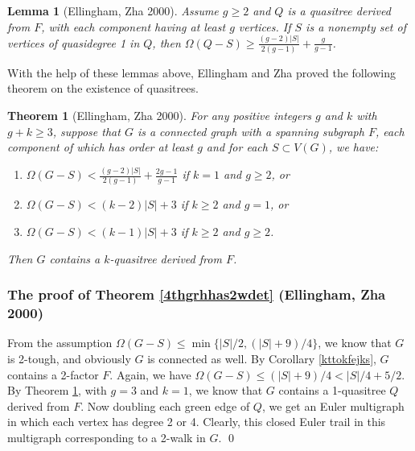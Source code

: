 \documentclass[12pt]{report}
\newtheorem{theorem}{Theorem}
\newtheorem{lemma}{Lemma}
\begin{document}
\begin{lemma}[Ellingham, Zha 2000]\label{lm33inez}
Assume $g\ge2$ and $Q$ is a quasitree derived from $F$, with each component having at least $g$ vertices. If $S$ is a nonempty set of vertices of quasidegree 1 in $Q$, then $\Omega(Q-S)\ge\frac{(g-2)|S|}{2(g-1)}+\frac{g}{g-1}$.
\end{lemma}

With the help of these lemmas above, Ellingham and Zha proved the following theorem on the existence of quasitrees.

\begin{theorem}[Ellingham, Zha 2000]\label{thm35inez}
For any positive integers $g$ and $k$ with $g+k\ge3$, suppose that $G$ is a connected graph with a spanning subgraph $F$, each component of which has order at least $g$ and for each $S\subset V(G)$, we have:
\begin{enumerate}
\item $\Omega(G-S)<\frac{(g-2)|S|}{2(g-1)}+\frac{2g-1}{g-1}$ if $k=1$ and $g\ge2$, or
\item $\Omega(G-S)<(k-2)|S|+3$ if $k\ge2$ and $g=1$, or
\item $\Omega(G-S)<(k-1)|S|+3$ if $k\ge2$ and $g\ge2$.
\end{enumerate}
Then $G$ contains a $k$-quasitree derived from $F$.
\end{theorem}










\subsubsection{The proof of Theorem \ref{4thgrhhas2wdet} (Ellingham, Zha 2000)}

From the assumption $\Omega(G-S)\le\min\{|S|/2,(|S|+9)/4\}$, we know that $G$ is 2-tough, and obviously $G$ is connected as well. By Corollary \ref{kttokfejks}, $G$ contains a 2-factor $F$. Again, we have $\Omega(G-S)\le(|S|+9)/4<|S|/4+5/2$. By Theorem \ref{thm35inez}, with $g=3$ and $k=1$, we know that $G$ contains a 1-quasitree $Q$ derived from $F$. Now doubling each green edge of $Q$, we get an Euler multigraph in which each vertex has degree 2 or 4. Clearly, this closed Euler trail in this multigraph corresponding to a 2-walk in $G$. \qed
\end{document}
